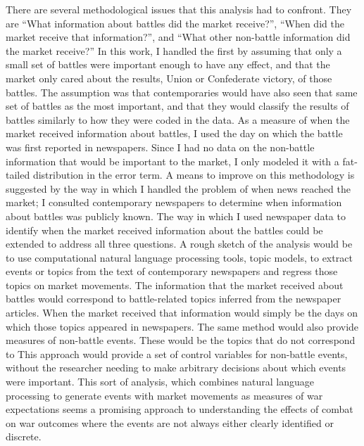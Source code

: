 There are several methodological issues that this analysis had to confront.
They are ``What information about battles did the market receive?'', ``When did the market receive that information?'', and ``What other non-battle information did the market receive?''
In this work, I handled the first by assuming that only a small set of battles were important enough to have any effect, and that the market only cared about the results, Union or Confederate victory, of those battles.
The assumption was that contemporaries would have also seen that same set of  battles as the most important, and that they would classify the results of battles similarly to how they were coded in the data.
As a measure of when the market received information about battles, I used the day on which the battle was first reported in newspapers.
Since I had no data on the non-battle information that would be important to the market, I only modeled it with a fat-tailed distribution in the error term.
A means to improve on this methodology is suggested by the way in which I handled the problem of when news reached the market; I consulted contemporary newspapers to determine when information about battles was publicly known.
The way in which I used newspaper data to identify when the market received information about the battles could be extended to address all three questions.
A rough sketch of the analysis would be to use computational natural language processing tools, \eg{}topic models, to extract events or topics from the text of contemporary newspapers and regress those topics on market movements.
The information that the market received about battles would correspond to battle-related topics inferred from the newspaper articles.
When the market received that information would simply be the days on which those topics appeared in newspapers.
The same method would also provide measures of non-battle events.
These would be the topics that do not correspond to 
This approach would provide a set of control variables for non-battle events, without the researcher needing to make arbitrary decisions about which events were important.
This sort of analysis, which combines natural language processing to generate events with market movements as measures of war expectations seems a promising approach to understanding the effects of combat on war outcomes where the events are not always either clearly identified or discrete. 



